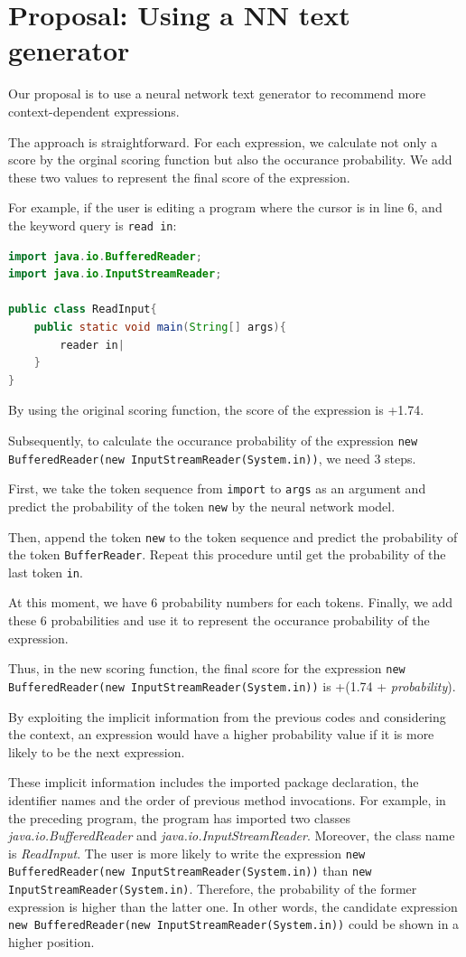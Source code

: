 \documentclass[PRO,english]{ipsj}
\begin{document}
\section{Proposal: Using a NN text generator}\label{sec:proposal}
Our proposal is to use a neural network text generator to recommend more context-dependent expressions.

The approach is straightforward. For each expression, we calculate not only a score by the orginal scoring function but also the occurance probability. We add these two values to represent the final score of the expression.

For example, if the user is editing a program where the cursor is in line 6, and the keyword query is \texttt{read in}:
\begin{lstlisting}[language=Java]
import java.io.BufferedReader;
import java.io.InputStreamReader;

public class ReadInput{
    public static void main(String[] args){
        reader in|
    }
}
\end{lstlisting}

By using the original scoring function, the score of the expression is +1.74. 

Subsequently, to calculate the occurance probability of the expression \texttt{new BufferedReader(new InputStreamReader(System.in))}, we need 3 steps. 

First, we take the token sequence from \texttt{import} to \texttt{args} as an argument and predict the probability of the token \texttt{new} by the neural network model. 

Then, append the token \texttt{new} to the token sequence and predict the probability of the token \texttt{BufferReader}. Repeat this procedure until get the probability of the last token \texttt{in}. 

At this moment, we have 6 probability numbers for each tokens.  Finally, we add these 6 probabilities and use it to represent the occurance probability of the expression.

Thus, in the new scoring function, the final score for the expression \texttt{new BufferedReader(new InputStreamReader(System.in))} is +(1.74 + \textit{probability}).

By exploiting the implicit information from the previous codes and considering the context, an expression would have a higher probability value if it is more likely to be the next expression. 

These implicit information includes the imported package declaration, the identifier names and the order of previous method invocations. For example, in the preceding program, the program has imported two classes \textit{java.io.BufferedReader} and \textit{java.io.InputStreamReader}. Moreover, the class name is \textit{ReadInput}. The user is more likely to write the expression \texttt{new BufferedReader(new InputStreamReader(System.in))} than \texttt{new InputStreamReader(System.in)}. Therefore, the probability of the former expression is higher than the latter one. In other words, the candidate expression \texttt{new BufferedReader(new InputStreamReader(System.in))} could be shown in a higher position.
\end{document}
